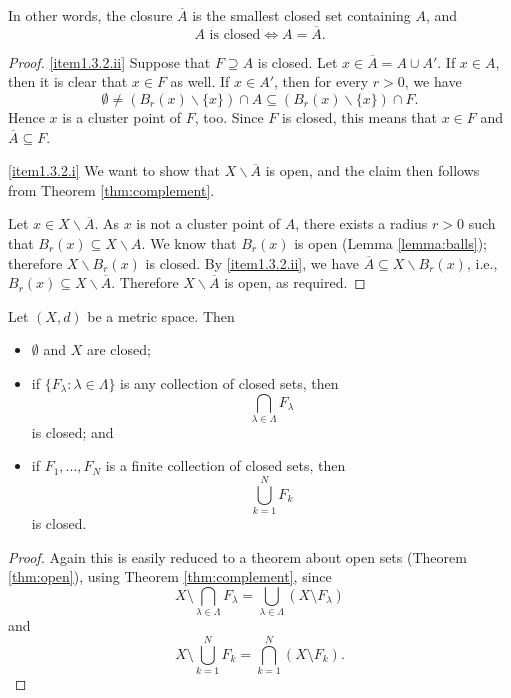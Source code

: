 In other words, the closure $\overline{A}$ is the smallest closed set containing $A$, and 
$$
A \mbox{ is closed} \Leftrightarrow A = \overline A.
$$

\np

\begin{proof}
\eqref{item1.3.2.ii} Suppose that $F \supseteq A$ is closed. Let
$x \in \overline{A} = A \cup A'$. If $x \in A$, then it is
clear that $x \in F$ as well. If $x \in A'$, then for every
$r > 0$, we have
\[
\emptyset \not= (B_r(x) \backslash \{x\}) \cap A \subseteq (B_r(x) \backslash \{x\}) \cap F.
\]
Hence $x$ is a cluster point of $F$, too. Since $F$ is closed,
this means that $x \in F$ and $\overline{A} \subseteq F$.

\bis

\eqref{item1.3.2.i} We want to show that $X \backslash \overline{A}$ is open, and the
claim then follows from Theorem \ref{thm:complement}.

Let $x \in X \backslash \overline{A}$. As $x$ is not a cluster point of $A$,
there exists a radius $r > 0$ such that $B_r(x) \subseteq X \backslash A$.
We know that $B_r(x)$ is open (Lemma \ref{lemma:balls}); therefore  $X \backslash B_r(x)$
is closed. By \eqref{item1.3.2.ii}, we have $\overline{A} \subseteq X \backslash B_r(x)$,
i.e., $B_r(x) \subseteq X \backslash \overline{A}$. Therefore $X \backslash \overline{A}$
is open, as required.
\end{proof}

\np

\begin{theorem}
Let $(X,d)$ be a metric space. Then
\begin{itemize}
\item $\emptyset$ and $X$ are closed;
\item if $\{F_\lambda: \lambda \in \Lambda\}$ is any collection
of closed sets, then
\[
\bigcap_{\lambda \in \Lambda} F_\lambda
\]
is closed; and
\item if $F_1, \ldots, F_N$ is a finite collection of
closed sets, then
\[
\bigcup_{k = 1}^N F_k
\]
is closed.
\end{itemize}
\end{theorem}

\begin{proof}
Again this is easily reduced to a theorem about open sets (Theorem \ref{thm:open}), using Theorem \ref{thm:complement}, since 
$$
X\setminus \bigcap_{\lambda \in \Lambda} F_\lambda = \bigcup_{\lambda \in \Lambda} (X\setminus F_\lambda)
$$
and 
$$
X\setminus \bigcup_{k = 1}^N F_k = \bigcap_{k = 1}^N (X\setminus F_k).
$$
\end{proof}

